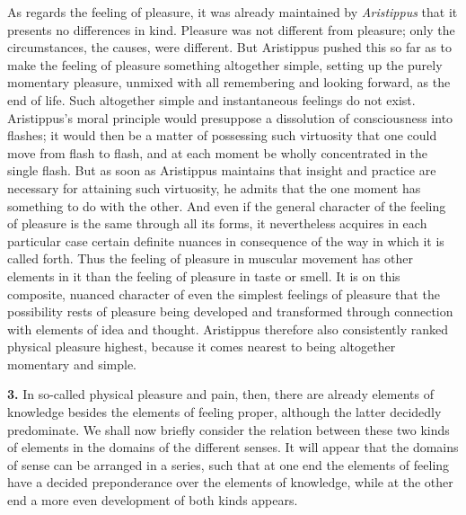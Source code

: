 \documentclass[12pt,a4paper]{book}
\newcommand{\opage}[1]{\marginnote{\footnotesize\textit{[#1]}}}
\begin{document}
As regards the feeling of pleasure, it was already maintained by
\emph{Aristippus} that it presents no differences in kind. Pleasure was
not different from pleasure; only the circumstances, the causes, were
different. But Aristippus pushed this so far as to make the feeling of
pleasure something altogether simple, setting up the purely momentary
pleasure, unmixed with all remembering and looking forward, as the end
of life. Such altogether simple and instantaneous feelings do not exist.
Aristippus's moral principle would presuppose a dissolution of
consciousness into flashes; it would then be a matter of possessing such
virtuosity that one could move from flash to flash, and at each moment
be wholly concentrated in the single flash. But as soon as Aristippus
maintains that insight and practice are necessary for attaining such
virtuosity, he admits that the one moment has something to do with the
other. And even if the general character of the feeling of pleasure is
the same through all its forms, it nevertheless acquires in each
particular case certain definite nuances in consequence of the way in
which it is called forth. Thus the feeling of pleasure in muscular
movement has other elements in it than the feeling of pleasure in taste
or smell. It is on this composite, nuanced character of even the
simplest feelings of pleasure that the possibility rests of pleasure
being developed and transformed through connection with elements of idea
and thought. Aristippus therefore also consistently ranked physical
pleasure highest, because it comes nearest to being altogether momentary
and simple.

\textbf{3.} In so-called physical pleasure and pain, then, there are
already elements of knowledge besides the elements of feeling proper,
although the latter decidedly predominate. We shall now briefly consider
the relation between these two kinds of elements in the domains of the
different senses. It will appear that the domains of sense can be
arranged in a series, such that at one end the elements of feeling have
a decided preponderance over
\opage{273}the elements of knowledge, while at the other end a more even
development of both kinds appears.
\end{document}
